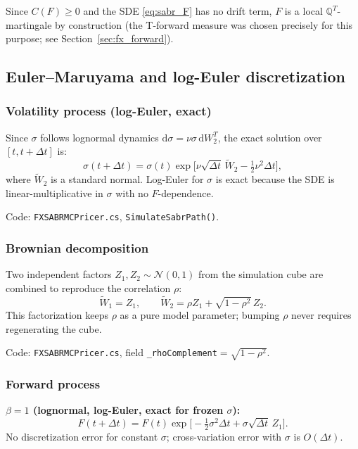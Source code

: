 \documentclass[11pt,a4paper]{article}
\newcommand{\dd}{\mathrm{d}}
\newcommand{\QT}{\mathbb{Q}^T}
\newcommand{\N}{\mathcal{N}}
\newcommand{\coderef}[1]{\texttt{\color{blue!60!black}#1}}
\theoremstyle{definition}
\begin{document}
Since $C(F)\geq 0$ and the SDE \eqref{eq:sabr_F} has no drift term, $F$ is a
local $\QT$-martingale by construction (the T-forward measure was chosen
precisely for this purpose; see Section~\ref{sec:fx_forward}).

\subsection{Euler--Maruyama and log-Euler discretization}

\subsubsection{Volatility process (log-Euler, exact)}

Since $\sigma$ follows lognormal dynamics $\dd\sigma=\nu\sigma\,\dd W_2^T$,
the exact solution over $[t,t+\Delta t]$ is:
\[
  \sigma(t+\Delta t)=\sigma(t)\exp\!\bigl[\nu\sqrt{\Delta t}\,\tilde W_2
                                          -\tfrac{1}{2}\nu^2\Delta t\bigr],
\]
where $\tilde W_2$ is a standard normal.  Log-Euler for $\sigma$ is exact
because the SDE is linear-multiplicative in $\sigma$ with no $F$-dependence.

Code: \coderef{FXSABRMCPricer.cs}, \texttt{SimulateSabrPath()}.

\subsubsection{Brownian decomposition}

Two independent factors $Z_1,Z_2\sim\N(0,1)$ from the simulation cube are
combined to reproduce the correlation $\rho$:
\[
  \tilde W_1 = Z_1,\qquad \tilde W_2 = \rho Z_1 + \sqrt{1-\rho^2}\,Z_2.
\]
This factorization keeps $\rho$ as a pure model parameter; bumping $\rho$
never requires regenerating the cube.

Code: \coderef{FXSABRMCPricer.cs}, field \texttt{\_rhoComplement}$=\sqrt{1-\rho^2}$.

\subsubsection{Forward process}

\textbf{$\beta=1$ (lognormal, log-Euler, exact for frozen $\sigma$):}
\[
  F(t+\Delta t) = F(t)\exp\!\bigl[-\tfrac{1}{2}\sigma^2\Delta t
                                   +\sigma\sqrt{\Delta t}\,Z_1\bigr].
\]
No discretization error for constant $\sigma$; cross-variation error with
$\sigma$ is $O(\Delta t)$.
\end{document}
